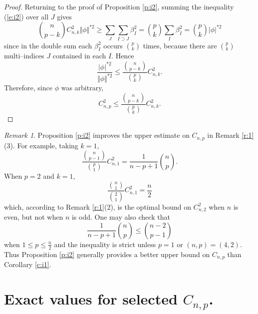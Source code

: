 \documentclass[12pt]{amsart}
\theoremstyle{definition}
\theoremstyle{remark}
\newtheorem{remark}[theorem]{Remark}
\numberwithin{equation}{section}
\begin{document}
\begin{proof}
 Returning to the proof of Proposition \ref{p:i2}, summing the inequality (\ref{e:i2}) over all $J$ gives
 \begin{equation*}
  \binom{n}{p-k}  C_{n,k}^2 \Vert \phi\Vert^{\ast2} \geq \sum_J\sum_{I \supset J} \beta_I^2 = \binom{p}{k}\sum_I \beta_I^2 =\binom{p}{k} |\phi|^{\ast 2}
  \end{equation*} 
 since in the double sum each $\beta_I^2$ occurs $\binom{p}{k}$ times, because there are $\binom{p}{k}$ multi--indices $J$ contained in each $I$.
 Hence
 \begin{equation*}
  \frac {|\phi|^{\ast 2}}{\Vert \phi\Vert^{\ast2}} \leq   \frac {\binom{n}{p-k}}{\binom{p}{k}} C_{n,k}^2. 
  \end{equation*}
 Therefore, since $\phi$ was arbitrary,
 \begin{equation*}
 C_{n,p}^2 \leq \frac {\binom{n}{p-k}}{\binom{p}{k}} C_{n,k}^2.
 \end{equation*}
 \end{proof}
 
 
 \begin{remark}%
Proposition \ref{p:i2} improves the upper estimate on $C_{n,p}$ in Remark \ref{r:1}(3). For example, taking $k=1$, 
\begin{equation*}\frac {\binom{n}{p-1}}{\binom{p}{1}} C_{n,1}^2 = \frac 1{n-p+1}\binom{n}{p}.\end{equation*} 
 When $p=2$ and $k=1$,
\begin{equation*}\frac {\binom{n}{1}}{\binom{2}{1}} C_{n,1}^2 = \frac n2 \end{equation*} 
which, according to Remark \ref{r:1}(2), is the optimal bound on $C^2_{n,2}$ when $n$ is even, but not when $n$ is odd.
One may also  check that
\begin{equation*}
\frac 1{n-p+1}\binom{n}{p} \leq \binom{n-2}{p-1}
\end{equation*}
when $1\leq p \leq \frac {n}{2}$ and the inequality is strict unless $p=1$ or $(n,p) = (4,2)$.
Thus Proposition \ref{p:i2} generally provides a better upper bound on $C_{n,p}$ than Corollary \ref{c:i1}.

\end{remark}


\section{Exact values for selected $C_{n,p}$.}%
\end{document}
